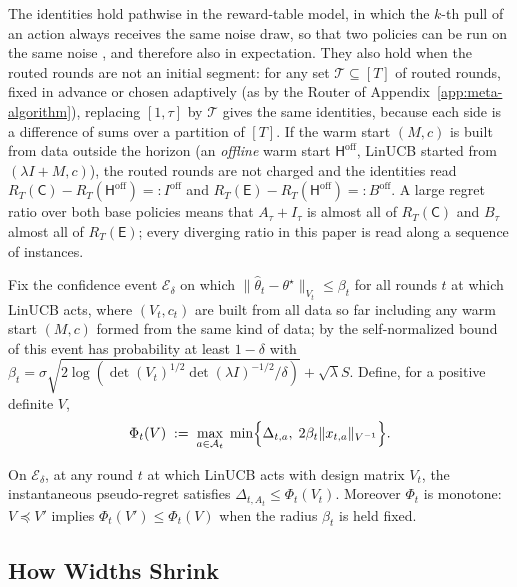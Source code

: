\documentclass[anon]{alt2027} %
\newcommand{\Cold}{\mathsf{C}}
\newcommand{\Exp}{\mathsf{E}}
\newcommand{\Hyb}{\mathsf{H}}
\begin{document}
\begin{remark}
\label{rem:decomp}
The identities hold pathwise in the reward-table model, in which the $k$-th
pull of an action always receives the same noise draw, so that two policies
can be run on the same noise \citep[\S4.6]{lattimore2020bandit}, and
therefore also in expectation. They also hold when the routed rounds are not
an initial segment: for any set $\mathcal T\subseteq[T]$ of routed rounds,
fixed in advance or chosen adaptively (as by the Router of
Appendix~\ref{app:meta-algorithm}), replacing $[1,\tau]$ by $\mathcal T$
gives the same identities, because each side is a difference of sums over a
partition of $[T]$. If the warm start $(M,c)$ is built from data outside the
horizon (an \emph{offline} warm start $\Hyb^{\mathrm{off}}$, LinUCB started
from $(\lambda I+M,c)$), the routed rounds are not charged and the identities
read $R_T(\Cold)-R_T(\Hyb^{\mathrm{off}})=:I^{\mathrm{off}}$ and
$R_T(\Exp)-R_T(\Hyb^{\mathrm{off}})=:B^{\mathrm{off}}$. A large regret ratio over both
base policies means that $A_\tau+I_\tau$ is almost all of $R_T(\Cold)$ and
$B_\tau$ almost all of $R_T(\Exp)$; every diverging ratio in this paper is
read along a sequence of instances.
\end{remark}

Fix the confidence event $\mathcal E_\delta$ on which
$\|\widehat\theta_t-\theta^\star\|_{V_t}\le\beta_t$ for all rounds $t$ at
which LinUCB acts, where $(V_t,c_t)$ are built from all data so far including
any warm start $(M,c)$ formed from the same kind of data; by the
self-normalized bound of \citet{abbasi2011improved} this event has probability
at least $1-\delta$ with
$\beta_t=\sigma\sqrt{2\log(\det(V_t)^{1/2}\det(\lambda I)^{-1/2}/\delta)}+\sqrt\lambda S$.
Define, for a positive definite $V$,
\begin{equation}
\label{eq:phi}
\Phi_t(V)\;:=\;\max_{a\in\mathcal A_t}\;\min\Bigl\{\Delta_{t,a},\;2\beta_t\|x_{t,a}\|_{V^{-1}}\Bigr\}.
\end{equation}

\begin{lemma}
\label{lem:width-limited}
On $\mathcal E_\delta$, at any round $t$ at which LinUCB acts with design
matrix $V_t$, the instantaneous pseudo-regret satisfies
$\Delta_{t,A_t}\le\Phi_t(V_t)$. Moreover $\Phi_t$ is monotone: $V\preceq V'$
implies $\Phi_t(V')\le\Phi_t(V)$ when the radius $\beta_t$ is held fixed.
\end{lemma}

\subsection{How Widths Shrink}
\label{app:widths}
\end{document}
